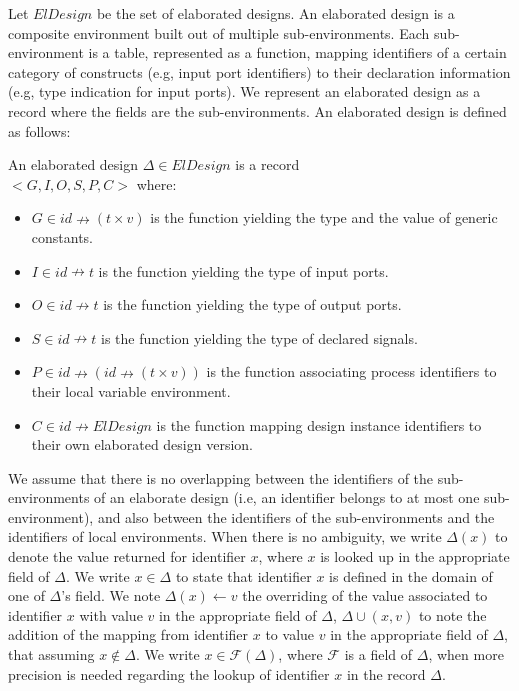 Let $ElDesign$ be the set of elaborated designs. An elaborated design
is a composite environment built out of multiple sub-environments.
Each sub-environment is a table, represented as a function, mapping
identifiers of a certain category of constructs (e.g, input port
identifiers) to their declaration information (e.g, type indication
for input ports). We represent an elaborated design as a record where
the fields are the sub-environments. An elaborated design is defined
as follows:

\begin{definition}
  \label{def:elab-design}
  An elaborated design $\Delta\in{}ElDesign$ is a record\\
  ${<}G, I, O, S, P, C{>}$ where:
  \begin{itemize}[label=$-$]
  \item $G\in{}id\nrightarrow{}(t\times{}v)$
    is the function yielding the type and the value of generic
    constants.
  \item $I\in{}id\nrightarrow{}t$ is the function
    yielding the type of input ports.
  \item $O\in{}id\nrightarrow{}t$ is the function
    yielding the type of output ports.
  \item
    $S\in{}id\nrightarrow{}t$
    is the function yielding the type of declared signals.
  \item $P\in{}id\nrightarrow(id\nrightarrow{}(t\times{}v))$ is the
    function associating process identifiers to their local variable
    environment.
  \item $C\in{}id{}\nrightarrow{}ElDesign$ is the function mapping
    design instance identifiers to their own elaborated design
    version.
  \end{itemize}
\end{definition}

We assume that there is no overlapping between the identifiers of the
sub-environments of an elaborate design (i.e, an identifier belongs to
at most one sub-environment), and also between the identifiers of the
sub-environments and the identifiers of local environments. When there
is no ambiguity, we write $\Delta(x)$ to denote the value returned for
identifier $x$, where $x$ is looked up in the appropriate field of
$\Delta$. We write $x\in\Delta$ to state that identifier $x$ is
defined in the domain of one of $\Delta$'s field. We note
$\Delta(x)\leftarrow{}v$ the overriding of the value associated to
identifier $x$ with value $v$ in the appropriate field of $\Delta$,
$\Delta\cup{}(x,v)$ to note the addition of the mapping from
identifier $x$ to value $v$ in the appropriate field of $\Delta$, that
assuming $x\notin\Delta$. We write $x\in\mathcal{F}(\Delta)$, where
$\mathcal{F}$ is a field of $\Delta$, when more precision is needed
regarding the lookup of identifier $x$ in the record $\Delta$.\\

